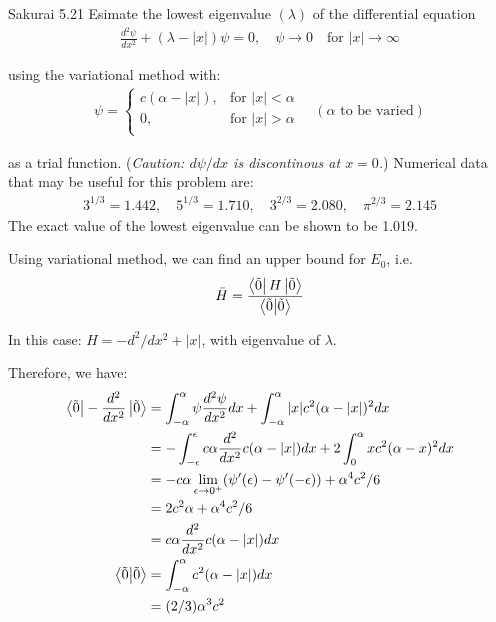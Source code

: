 \documentclass{article}
\begin{document}
	\newpage
	\begin{section}{Sakurai 5.21}
		Esimate the lowest eigenvalue $(\lambda)$ of the differential equation
		\begin{align*}
			\frac{d^2 \psi}{dx^2} + (\lambda - |x|)\psi = 0, \quad \psi \to 0 \quad \text{for $|x| \to \infty$}
		\end{align*}

		using the variational method with:
		\begin{align*}
			\psi = \begin{cases}
				c(\alpha - |x|), & \text{for $|x| < \alpha$} \\
				0, & \text{for $|x| > \alpha$} \\
			\end{cases} \quad (\text{$\alpha$ to be varied})
		\end{align*}

		as a trial function. ({\it Caution: $d\psi/dx$ is discontinous at $x = 0$.}) Numerical data that may be useful for this problem are:
		\begin{align*}
			3^{1/3} = 1.442, \quad 5^{1/3} = 1.710, \quad 3^{2/3} = 2.080, \quad \pi^{2/3} = 2.145 
		\end{align*}
		The exact value of the lowest eigenvalue can be shown to be 1.019.
		
		\begin{tcolorbox}[breakable]
			Using variational method, we can find an upper bound for $E_0$, i.e.
			\begin{align*}
				\bar{H} = \frac{\bra{\tilde{0}}H\ket{\tilde{0}}}{\bra{\tilde{0}}\ket{\tilde{0}}}
			\end{align*}

			In this case: $H = -d^2/dx^2 + |x|$, with eigenvalue of $\lambda$.

			Therefore, we have:
			\begin{align*}
				\bra{\tilde{0}}-\frac{d^2}{dx^2}\ket{\tilde{0}} &= \int_{-\alpha}^{\alpha} \psi \frac{d^2\psi}{dx^2}  dx + \int_{-\alpha}^{\alpha} |x| c^2(\alpha - |x|)^2  dx \\
				&= -\int_{-\epsilon}^{\epsilon} c\alpha \frac{d^2}{dx^2} c(\alpha - |x|) dx + 2\int_{0}^{\alpha} x c^2(\alpha - x)^2  dx \\
				&= -c\alpha \lim_{\epsilon \to 0^+}(\psi'(\epsilon) - \psi'(-\epsilon)) + \alpha^4 c^2/6 \\
				&= 2c^2\alpha + \alpha^4 c^2/6 \\
				&= c\alpha \frac{d^2}{dx^2} c(\alpha - |x|) dx \\
				\bra{\tilde{0}}\ket{\tilde{0}} &= \int_{-\alpha}^{\alpha} c^2(\alpha - |x|) dx \\
				&= (2/3) \alpha^3 c^2
			\end{align*}


\end{tcolorbox}
\end{section}
\end{document}
